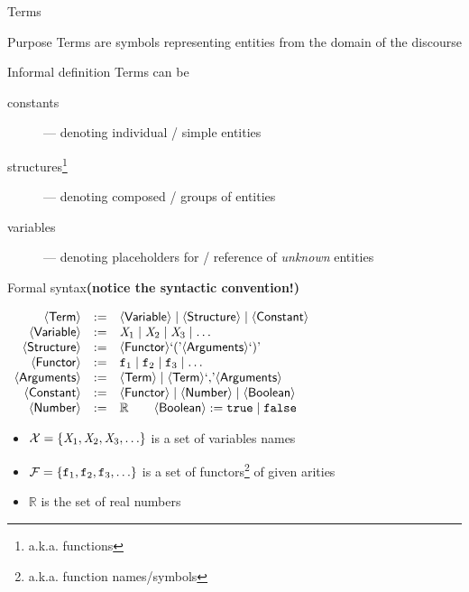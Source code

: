 \documentclass[presentation]{beamer}\mode<presentation>{\usetheme{AMSBolognaFC}}
\begin{document}
\begin{frame}[allowframebreaks]{Terms}
    \begin{block}{Purpose}\centering
        Terms are symbols representing entities from the \alert{domain of the discourse}
    \end{block}
    \begin{block}{Informal definition}
        Terms can be
        \begin{description}
            \item[constants] --- denoting \alert{individual} / simple entities
            \item[structures\footnote{a.k.a. functions}] --- denoting \alert{composed} / groups of entities
            \item[variables] --- denoting \alert{placeholders} for / reference of \emph{unknown} entities
        \end{description}
    \end{block}
    \begin{alertblock}{Formal syntax\hfill\textbf{\footnotesize(notice the syntactic convention!)}}
        \label{slide:terms}
        \begin{center}
            $\begin{array}{rcl}
                \mathsf{\left\langle Term\right\rangle} & := & \mathsf{\left\langle Variable\right\rangle} \mid \mathsf{\left\langle Structure\right\rangle} \mid \mathsf{\left\langle Constant\right\rangle}
                \\
                \mathsf{\left\langle Variable\right\rangle} & := & \mathit{X}_1 \mid \mathit{X}_2 \mid \mathit{X}_3 \mid \ldots
                \\
                \mathsf{\left\langle Structure\right\rangle} & := & \mathsf{\left\langle Functor\right\rangle} \text{`}\mathit{(}\text{'} \mathsf{\left\langle Arguments\right\rangle} \text{`}\mathit{)}\text{'}
                \\
                \mathsf{\left\langle Functor\right\rangle} & := & \mathtt{f}_1 \mid \mathtt{f}_2 \mid \mathtt{f}_3 \mid \ldots
                \\
                \mathsf{\left\langle Arguments\right\rangle} & := & \mathsf{\left\langle Term\right\rangle} \mid \mathsf{\left\langle Term\right\rangle} \text{`}\mathit{,}\text{'} \mathsf{\left\langle Arguments\right\rangle}
                \\
                \mathsf{\left\langle Constant\right\rangle} & := & \mathsf{\left\langle Functor\right\rangle} \mid \mathsf{\left\langle Number\right\rangle}\mid \mathsf{\left\langle Boolean\right\rangle}
                \\
                \mathsf{\left\langle Number\right\rangle} & := & \mathbb{R} \qquad \mathsf{\left\langle Boolean\right\rangle} :=  \mathtt{true} \mid \mathtt{false}
            \end{array}$
        \end{center}
        \begin{itemize}
            \item $\mathcal{X} = \{ \mathit{X}_1, \mathit{X}_2, \mathit{X}_3, \ldots \}$ is a set of \alert{variables names}
            \item $\mathcal{F} = \{ \mathtt{f}_1, \mathtt{f}_2, \mathtt{f}_3, \ldots \}$ is a set of \alert{functors}\footnote{a.k.a. function names/symbols} of given \alert{arities}
            \item $\mathbb{R}$ is the set of real numbers
        \end{itemize}
    \end{alertblock}


\end{frame}
\end{document}
